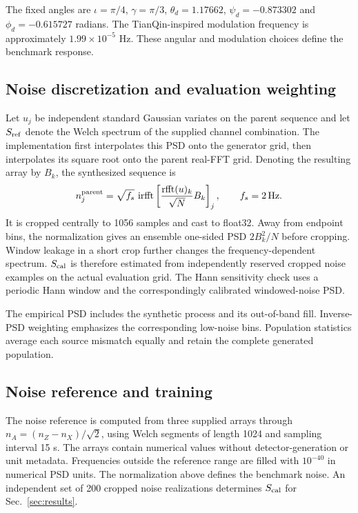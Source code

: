\documentclass[10pt,prd,aps,a4paper,twocolumn,superscriptaddress,nofootinbib,floatfix]{revtex4-2}
\begin{document}
The fixed angles are $\iota=\pi/4$, $\gamma=\pi/3$, $\theta_d=1.17662$, $\psi_d=-0.873302$ and $\phi_d=-0.615727$ radians. The TianQin-inspired modulation frequency is approximately $1.99\times10^{-5}$ Hz. These angular and modulation choices define the benchmark response.

\subsection{Noise discretization and evaluation weighting}
Let $u_j$ be independent standard Gaussian variates on the parent sequence and let $S_{\rm ref}$ denote the Welch spectrum of the supplied channel combination. The implementation first interpolates this PSD onto the generator grid, then interpolates its square root onto the parent real-FFT grid. Denoting the resulting array by $B_k$, the synthesized sequence is
\begin{equation}n_j^{\rm parent}=\sqrt{f_s}\,\operatorname{irfft}\left[\frac{\operatorname{rfft}(u)_k}{\sqrt N}B_k\right]_j,\qquad f_s=2\,\mathrm{Hz}.
\end{equation}
It is cropped centrally to 1056 samples and cast to float32. Away from endpoint bins, the normalization gives an ensemble one-sided PSD $2B_k^2/N$ before cropping. Window leakage in a short crop further changes the frequency-dependent spectrum. $S_{\rm cal}$ is therefore estimated from independently reserved cropped noise examples on the actual evaluation grid. The Hann sensitivity check uses a periodic Hann window and the correspondingly calibrated windowed-noise PSD.

The empirical PSD includes the synthetic process and its out-of-band fill. Inverse-PSD weighting emphasizes the corresponding low-noise bins. Population statistics average each source mismatch equally and retain the complete generated population.

\subsection{Noise reference and training}
The noise reference is computed from three supplied arrays through $n_A=(n_Z-n_X)/\sqrt2$, using Welch segments of length 1024 and sampling interval 15 s. The arrays contain numerical values without detector-generation or unit metadata. Frequencies outside the reference range are filled with $10^{-40}$ in numerical PSD units. The normalization above defines the benchmark noise. An independent set of 200 cropped noise realizations determines $S_{\rm cal}$ for Sec.~\ref{sec:results}.
\end{document}
